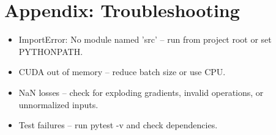 \documentclass[conference]{IEEEtran}
\begin{document}
\section{Appendix: Troubleshooting}
\begin{itemize}
\item ImportError: No module named 'src' -- run from project root or set PYTHONPATH.
\item CUDA out of memory -- reduce batch size or use CPU.
\item NaN losses -- check for exploding gradients, invalid operations, or unnormalized inputs.
\item Test failures -- run pytest -v and check dependencies.
\end{itemize}
\end{document}
